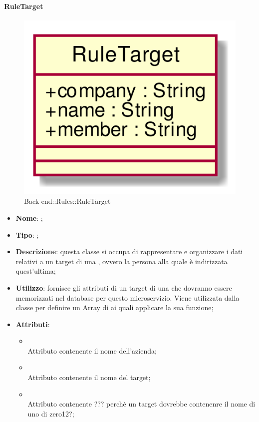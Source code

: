 \hypertarget{RuleTarget_label}{\paragraph{RuleTarget}}
\begin{figure}[h]
	\centering
	\includegraphics[width=\textwidth,height=\textheight,keepaspectratio]{images/ClassRuleTarget.png}
	\caption{Back-end::Rules::RuleTarget}
\end{figure}
\begin{itemize}
	\item \textbf{Nome}: ;
	\item \textbf{Tipo}: ;
	\item \textbf{Descrizione}: questa classe si occupa di rappresentare e organizzare i dati relativi a un target di una , ovvero la persona alla quale è indirizzata quest'ultima;
	\item \textbf{Utilizzo}: fornisce gli attributi di un target di una  che dovranno essere memorizzati nel database per questo microservizio.
Viene utilizzata dalla classe  per definire un Array di  ai quali applicare la sua funzione;
	\item \textbf{Attributi}:
	\begin{itemize}
		\item[]  \\
		Attributo contenente il nome dell'azienda;
		\item[]  \\
		Attributo contenente il nome del target;
		\item[]  \\
		Attributo contenente ??? perchè un target dovrebbe contenenre il nome di uno di zero12?;
	\end{itemize}
\end{itemize}

